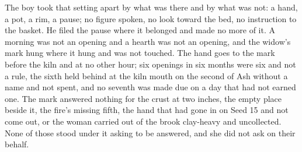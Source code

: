 The boy took that setting apart by what was there and by what was not: a hand, a pot, a rim, a pause; no figure spoken, no look toward the bed, no instruction to the basket. He filed the pause where it belonged and made no more of it. A morning was not an opening and a hearth was not an opening, and the widow's mark hung where it hung and was not touched. The hand goes to the mark before the kiln and at no other hour; six openings in six months were six and not a rule, the sixth held behind at the kiln mouth on the second of Ash without a name and not spent, and no seventh was made due on a day that had not earned one. The mark answered nothing for the crust at two inches, the empty place beside it, the fire's missing fifth, the hand that had gone in on Seed 15 and not come out, or the woman carried out of the brook clay-heavy and uncollected. None of those stood under it asking to be answered, and she did not ask on their behalf.

\scenebreak

